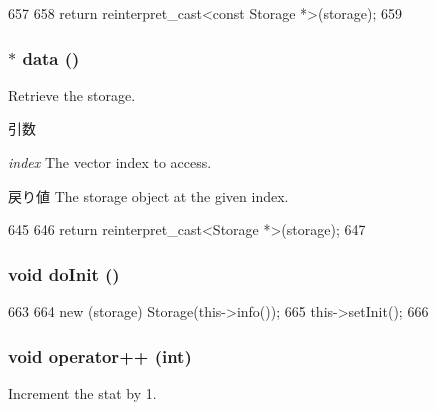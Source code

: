 \begin{DoxyCode}
657     {
658         return reinterpret_cast<const Storage *>(storage);
659     }
\end{DoxyCode}
\hypertarget{classStats_1_1ScalarBase_a6616795ceb2f25c33a3c2d6c0a387514}{
\subsubsection[{data}]{$\ast$ data ()}}
\label{classStats_1_1ScalarBase_a6616795ceb2f25c33a3c2d6c0a387514}
Retrieve the storage. 
\begin{DoxyParams}{引数}
\item[{\em index}]The vector index to access. \end{DoxyParams}
\begin{DoxyReturn}{戻り値}
The storage object at the given index. 
\end{DoxyReturn}



\begin{DoxyCode}
645     {
646         return reinterpret_cast<Storage *>(storage);
647     }
\end{DoxyCode}
\hypertarget{classStats_1_1ScalarBase_acbb3b2ff6c84b7ae0dcc576f85bee3b5}{
\subsubsection[{doInit}]{\setlength{\rightskip}{0pt plus 5cm}void doInit ()}}
\label{classStats_1_1ScalarBase_acbb3b2ff6c84b7ae0dcc576f85bee3b5}



\begin{DoxyCode}
663     {
664         new (storage) Storage(this->info());
665         this->setInit();
666     }
\end{DoxyCode}
\hypertarget{classStats_1_1ScalarBase_a2aefc5a84a51687145f8514f4029c26c}{
\subsubsection[{operator++}]{\setlength{\rightskip}{0pt plus 5cm}void operator++ (int)}}
\label{classStats_1_1ScalarBase_a2aefc5a84a51687145f8514f4029c26c}
Increment the stat by 1. 


